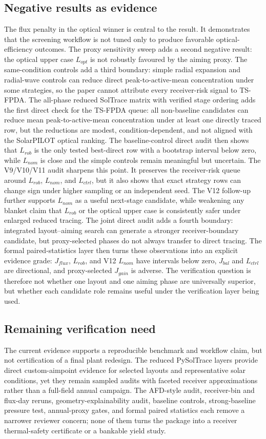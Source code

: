 \documentclass[final,3p,times]{elsarticle}
\begin{document}
\subsection{Negative results as evidence}
The flux penalty in the optical winner is central to the result. It demonstrates that the screening workflow is not tuned only to produce favorable optical-efficiency outcomes. The proxy sensitivity sweep adds a second negative result: the optical upper case $L_{opt}$ is not robustly favoured by the aiming proxy. The same-condition controls add a third boundary: simple radial expansion and radial-wave controls can reduce direct peak-to-active-mean concentration under some strategies, so the paper cannot attribute every receiver-risk signal to TS-FPDA. The all-phase reduced SolTrace matrix with verified stage ordering adds the first direct check for the TS-FPDA queue: all non-baseline candidates can reduce mean peak-to-active-mean concentration under at least one directly traced row, but the reductions are modest, condition-dependent, and not aligned with the SolarPILOT optical ranking. The baseline-control direct audit then shows that $L_{rob}$ is the only tested best-direct row with a bootstrap interval below zero, while $L_{nom}$ is close and the simple controls remain meaningful but uncertain. The V9/V10/V11 audit sharpens this point. It preserves the receiver-risk queue around $L_{rob}$, $L_{nom}$, and $L_{ctrl}$, but it also shows that exact strategy rows can change sign under higher sampling or an independent seed. The V12 follow-up further supports $L_{nom}$ as a useful next-stage candidate, while weakening any blanket claim that $L_{rob}$ or the optical upper case is consistently safer under enlarged reduced tracing. The joint direct audit adds a fourth boundary: integrated layout--aiming search can generate a stronger receiver-boundary candidate, but proxy-selected phases do not always transfer to direct tracing. The formal paired-statistics layer then turns these observations into an explicit evidence grade: $J_{flux}$, $L_{rob}$, and V12 $L_{nom}$ have intervals below zero, $J_{bal}$ and $L_{ctrl}$ are directional, and proxy-selected $J_{gain}$ is adverse. The verification question is therefore not whether one layout and one aiming phase are universally superior, but whether each candidate role remains useful under the verification layer being used.

\subsection{Remaining verification need}
The current evidence supports a reproducible benchmark and workflow claim, but not certification of a final plant redesign. The reduced PySolTrace layers provide direct custom-aimpoint evidence for selected layouts and representative solar conditions, yet they remain sampled audits with faceted receiver approximations rather than a full-field annual campaign. The AFD-style audit, receiver-bin and flux-day reruns, geometry-explainability audit, baseline controls, strong-baseline pressure test, annual-proxy gates, and formal paired statistics each remove a narrower reviewer concern; none of them turns the package into a receiver thermal-safety certificate or a bankable yield study.
\end{document}
